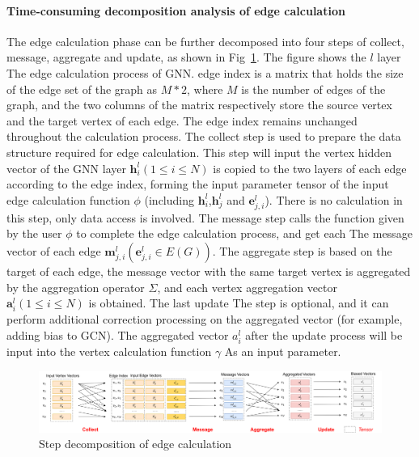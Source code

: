 \paragraph{Time-consuming decomposition analysis of edge calculation}
The edge calculation phase can be further decomposed into four steps of collect, message, aggregate and update,
as shown in Fig~\ref{fig:steps_in_edge_calculation}. The figure shows the $l$ layer The edge calculation process of GNN.
edge index is a matrix that holds the size of the edge set of the graph as $M*2$, where $M$ is the number of edges of the graph,
and the two columns of the matrix respectively store the source vertex and the target vertex of each edge.
The edge index remains unchanged throughout the calculation process.
The collect step is used to prepare the data structure required for edge calculation.
This step will input the vertex hidden vector of the GNN layer $\boldsymbol{h}_i^l (1 \leq i \leq N)$
is copied to the two layers of each edge according to the edge index, forming the input parameter tensor of the input edge calculation function $\phi$
(including $\boldsymbol{h}_i^l$,$\boldsymbol{h}_j^ l$ and $\boldsymbol{e}_{j, i}^l$).
There is no calculation in this step, only data access is involved. The message step calls the function given by the user $\phi$ to
complete the edge calculation process, and get each The message vector of each edge $\boldsymbol{m}_{j, i}^l (\boldsymbol{e}_{j, i}^l \in E(G))$.
The aggregate step is based on the target of each edge, the message vector with the same target vertex is aggregated by the aggregation operator $\Sigma$,
and each vertex aggregation vector $\boldsymbol{a}_i^l (1 \leq i \leq N)$ is obtained. 
The last update The step is optional, and it can perform additional correction processing on the aggregated vector (for example, adding bias to GCN).
The aggregated vector $a_i^l$ after the update process will be input into the vertex calculation function $\gamma$ As an input parameter.

\begin{figure}
    \centering
    \includegraphics[width=1\columnwidth]{figs/illustration/steps_in_edge_calculation.png}
    \caption{Step decomposition of edge calculation}
    \label{fig:steps_in_edge_calculation}
\end{figure}

